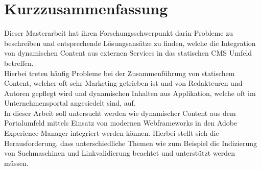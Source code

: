 \chapter*{Kurzzusammenfassung}
Dieser Masterarbeit hat ihren Forschungsschwerpunkt darin Probleme zu beschreiben und entsprechende Lösungsansätze zu finden, welche die Integration von dynamischen Content aus externen Services in das statischen CMS Umfeld betreffen. \\
Hierbei treten häufig Probleme bei der Zusammenführung von statischem Content, welcher oft sehr Marketing getrieben ist und von Redakteuren und Autoren gepflegt wird und dynamischen Inhalten aus Applikation, welche oft im Unternehmensportal angesiedelt sind, auf.\\
In dieser Arbeit soll untersucht werden wie dynamischer Content aus dem Portalumfeld mittels Einsatz von modernen Webframeworks in den Adobe Experience Manager integriert werden können. Hierbei stellt sich die Herausforderung, dass unterschiedliche Themen wie zum Beispiel die Indizierung von Suchmaschinen und Linkvalidierung beachtet und unterstützt werden müssen.\\

